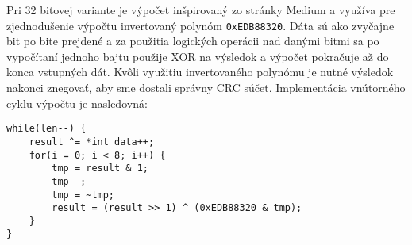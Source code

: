 \documentclass[../projekt.tex]{subfiles}
\begin{document}
Pri 32 bitovej variante je výpočet inšpirovaný zo stránky Medium\cite{crc32} a využíva pre zjednodušenie výpočtu invertovaný polynóm \texttt{0xEDB88320}. Dáta sú ako zvyčajne bit po bite prejdené a za použitia logických operácii nad danými bitmi sa po vypočítaní jednoho bajtu použije XOR na výsledok a výpočet pokračuje až do konca vstupných dát. Kvôli využitiu invertovaného polynómu je nutné výsledok nakonci znegovať, aby sme dostali správny CRC súčet. Implementácia vnútorného cyklu výpočtu je nasledovná:
\newpage
\begin{lstlisting}
while(len--) {
	result ^= *int_data++;
	for(i = 0; i < 8; i++) {
		tmp = result & 1;
		tmp--;
		tmp = ~tmp;
		result = (result >> 1) ^ (0xEDB88320 & tmp);
	}
}
\end{lstlisting}
\end{document}
